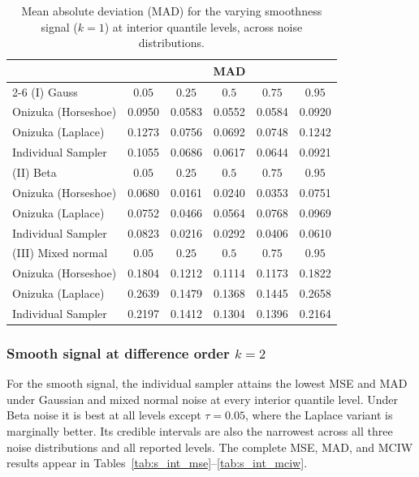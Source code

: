 \begin{table}[htbp]
\centering
\caption{Mean absolute deviation (MAD) for the varying smoothness signal ($k=1$) at interior quantile levels, across noise distributions.}
\label{tab:vs_int_mad}
\begin{tabular}{lccccc}
\toprule
& \multicolumn{5}{c}{MAD} \\
\cmidrule(lr){2-6}
(I) Gauss & $0.05$ & $0.25$ & $0.5$ & $0.75$ & $0.95$ \\
\midrule
Onizuka (Horseshoe) & 0.0950 & 0.0583 & 0.0552 & 0.0584 & 0.0920 \\
Onizuka (Laplace)   & 0.1273 & 0.0756 & 0.0692 & 0.0748 & 0.1242 \\
Individual Sampler  & 0.1055 & 0.0686 & 0.0617 & 0.0644 & 0.0921 \\
\midrule
(II) Beta & $0.05$ & $0.25$ & $0.5$ & $0.75$ & $0.95$ \\
\midrule
Onizuka (Horseshoe) & 0.0680 & 0.0161 & 0.0240 & 0.0353 & 0.0751 \\
Onizuka (Laplace)   & 0.0752 & 0.0466 & 0.0564 & 0.0768 & 0.0969 \\
Individual Sampler  & 0.0823 & 0.0216 & 0.0292 & 0.0406 & 0.0610 \\
\midrule
(III) Mixed normal & $0.05$ & $0.25$ & $0.5$ & $0.75$ & $0.95$ \\
\midrule
Onizuka (Horseshoe) & 0.1804 & 0.1212 & 0.1114 & 0.1173 & 0.1822 \\
Onizuka (Laplace)   & 0.2639 & 0.1479 & 0.1368 & 0.1445 & 0.2658 \\
Individual Sampler  & 0.2197 & 0.1412 & 0.1304 & 0.1396 & 0.2164 \\
\bottomrule
\end{tabular}
\end{table}

\subsubsection{Smooth signal at difference order \texorpdfstring{$k=2$}{k=2}}
\label{app:sim:individual:smooth}

For the smooth signal, the individual sampler attains the lowest MSE and MAD
under Gaussian and mixed normal noise at every interior quantile level.  Under
Beta noise it is best at all levels except $\tau=0.05$, where the Laplace
variant is marginally better.  Its credible intervals are also the narrowest
across all three noise distributions and all reported levels.  The complete
MSE, MAD, and MCIW results appear in
Tables~\ref{tab:s_int_mse}--\ref{tab:s_int_mciw}.

